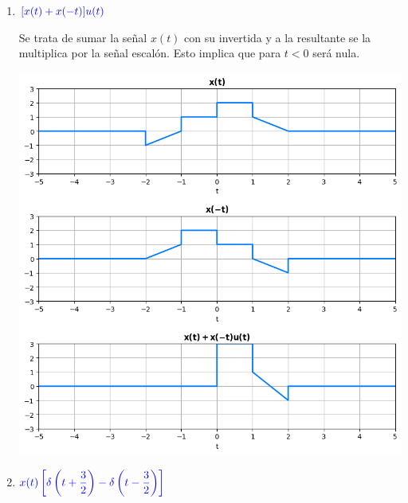 \begin{enumerate}[label=\color{red}\textbf{\arabic*)}, leftmargin=*]
\begin{enumerate}[label=\color{red}\alph*)]
			\item $\textcolor{blue}{[x(t)+x(-t)]u(t)}$
			
			Se trata de sumar la señal $x(t)$ con su invertida y a la resultante se la multiplica por la señal escalón. Esto implica que para $t<0$ será nula.
			
			\begin{center}
			\includegraphics[width=0.7\linewidth]{"Temas/Tema 1/screenshot008.png"}
			\end{center}
			
			\item $\textcolor{blue}{x(t)\left[\delta\left(t+\dfrac{3}{2}\right)-\delta\left(t-\dfrac{3}{2}\right)\right]}$
			

\end{enumerate}
\end{enumerate}

